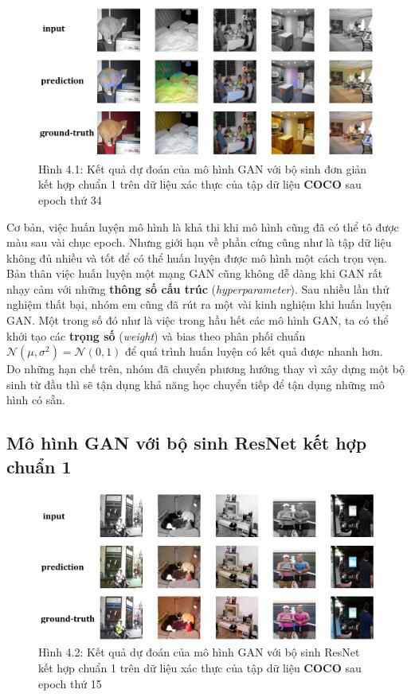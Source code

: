 \documentclass[a4paper]{article}
\begin{document}
\begin{figure}[h!]
\centering
\includegraphics[width=15cm]{images/4_0.png}
\caption{Hình 4.1: Kết quả dự đoán của mô hình GAN với bộ sinh đơn giản kết hợp chuẩn 1 trên dữ liệu xác thực của tập dữ liệu \textbf{COCO} sau epoch thứ 34}
\end{figure}

\noindent
Cơ bản, việc huấn luyện mô hình là khả thi khi mô hình cũng đã có thể tô được màu sau vài chục epoch. Nhưng giới hạn về phần cứng cũng như là tập dữ liệu không đủ nhiều và tốt để có thể huấn luyện được mô hình một cách trọn vẹn.\\
Bản thân việc huấn luyện một mạng GAN cũng không dễ dàng khi GAN rất nhạy cảm với những \textbf{thông số cấu trúc} (\textit{hyperparameter}). Sau nhiều lần thử nghiệm thất bại, nhóm em cũng đã rút ra một vài kinh nghiệm khi huấn luyện GAN. Một trong số đó như là việc trong hầu hết các mô hình GAN, ta có thể khởi tạo các \textbf{trọng số} (\textit{weight}) và bias theo phân phối chuẩn $\mathcal{N}\left(\mu, \sigma^2\right) = \mathcal{N}\left(0, 1\right)$ để quá trình huấn luyện có kết quả được nhanh hơn.\\

\noindent
Do những hạn chế trên, nhóm đã chuyển phương hướng thay vì xây dựng một bộ sinh từ đầu thì sẽ tận dụng khả năng học chuyển tiếp để tận dụng những mô hình có sẵn.

\subsection{Mô hình GAN với bộ sinh ResNet kết hợp chuẩn 1}

\begin{figure}[h!]
\centering
\includegraphics[width=15cm]{images/4_1.png}
\caption{Hình 4.2: Kết quả dự đoán của mô hình GAN với bộ sinh ResNet kết hợp chuẩn 1 trên dữ liệu xác thực của tập dữ liệu \textbf{COCO} sau epoch thứ 15}
\end{figure}
\end{document}
